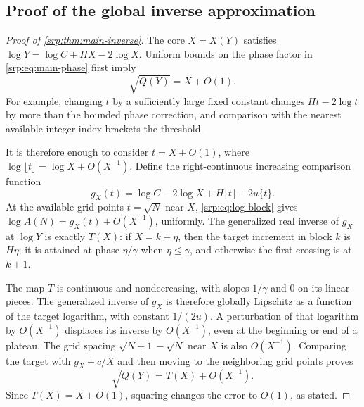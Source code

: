 \documentclass[11pt,a4paper]{article}
\numberwithin{equation}{section}
\theoremstyle{definition}
\theoremstyle{remark}
\begin{document}
\subsection{Proof of the global inverse approximation}
\begin{proof}[Proof of \cref{srp:thm:main-inverse}]
The core $X=X(Y)$ satisfies
$\log Y=\log C+HX-2\log X$. Uniform bounds on the phase factor in
\eqref{srp:eq:main-phase} first imply
\begin{equation}
 \sqrt{Q(Y)}=X+O(1).
 \label{srp:eq:coarse-inverse}
\end{equation}
For example, changing $t$ by a sufficiently large fixed constant changes
$Ht-2\log t$ by more than the bounded phase correction, and comparison
with the nearest available integer index brackets the threshold.

It is therefore enough to consider $t=X+O(1)$, where
$\log\lfloor t\rfloor=\log X+O(X^{-1})$. Define the right-continuous
increasing comparison function
\begin{equation}
 g_X(t)=\log C-2\log X+H\lfloor t\rfloor
        +2u\{t\}.
 \label{srp:eq:gX}
\end{equation}
At the available grid points $t=\sqrt N$ near $X$,
\eqref{srp:eq:log-block} gives
$\log A(N)=g_X(t)+O(X^{-1})$, uniformly. The generalized real inverse
of $g_X$ at $\log Y$ is exactly $T(X)$: if $X=k+\eta$, then the target
increment in block $k$ is $H\eta$; it is attained at phase
$\eta/\gamma$ when $\eta\le\gamma$, and otherwise the first crossing is
at $k+1$.

The map $T$ is continuous and nondecreasing, with slopes $1/\gamma$
and $0$ on its linear pieces. The generalized inverse of $g_X$ is
therefore globally Lipschitz as a function of the target logarithm,
with constant $1/(2u)$. A perturbation of that logarithm by
$O(X^{-1})$ displaces its inverse by $O(X^{-1})$, even at the beginning
or end of a plateau. The grid spacing
$\sqrt{N+1}-\sqrt N$ near $X$ is also $O(X^{-1})$. Comparing the target
with $g_X\pm c/X$ and then moving to the neighboring grid points proves
\[
 \sqrt{Q(Y)}=T(X)+O(X^{-1}).
\]
Since $T(X)=X+O(1)$, squaring changes the error to $O(1)$, as stated.
\end{proof}
\end{document}
